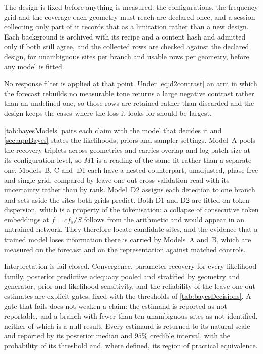 The design is fixed before anything is measured: the configurations, the frequency grid and the coverage each geometry must reach are declared once, and a session collecting only part of it records that as a limitation rather than a new design. Each background is archived with its recipe and a content hash and admitted only if both still agree, and the collected rows are checked against the declared design, for unambiguous sites per branch and usable rows per geometry, before any model is fitted.

No response filter is applied at that point. Under \autoref{eq:d2contrast} an arm in which the forecast rebuilds no measurable tone returns a large negative contrast rather than an undefined one, so those rows are retained rather than discarded and the design keeps the cases where the loss it looks for should be largest.

\autoref{tab:bayesModels} pairs each claim with the model that decides it and \autoref{sec:appBayes} states the likelihoods, priors and sampler settings. Model~A pools the recovery triplets across geometries and carries overlap and log patch size at its configuration level, so $M1$ is a reading of the same fit rather than a separate one. Models~B, C and~D1 each have a nested counterpart, unadjusted, phase-free and single-grid, compared by leave-one-out cross-validation read with its uncertainty rather than by rank. Model~D2 assigns each detection to one branch and sets aside the sites both grids predict. Both D1 and D2 are fitted on token dispersion, which is a property of the tokenisation: a collapse of consecutive token embeddings at $f=c f_s/S$ follows from the arithmetic and would appear in an untrained network. They therefore locate candidate sites, and the evidence that a trained model loses information there is carried by Models~A and~B, which are measured on the forecast and on the representation against matched controls.

Interpretation is fail-closed. Convergence, parameter recovery for every likelihood family, posterior predictive adequacy pooled and stratified by geometry and generator, prior and likelihood sensitivity, and the reliability of the leave-one-out estimates are explicit gates, fixed with the thresholds of \autoref{tab:bayesDecisions}. A gate that fails does not weaken a claim: the estimand is reported as not reportable, and a branch with fewer than ten unambiguous sites as not identified, neither of which is a null result. Every estimand is returned to its natural scale and reported by its posterior median and $95\%$ credible interval, with the probability of its threshold and, where defined, its region of practical equivalence.
